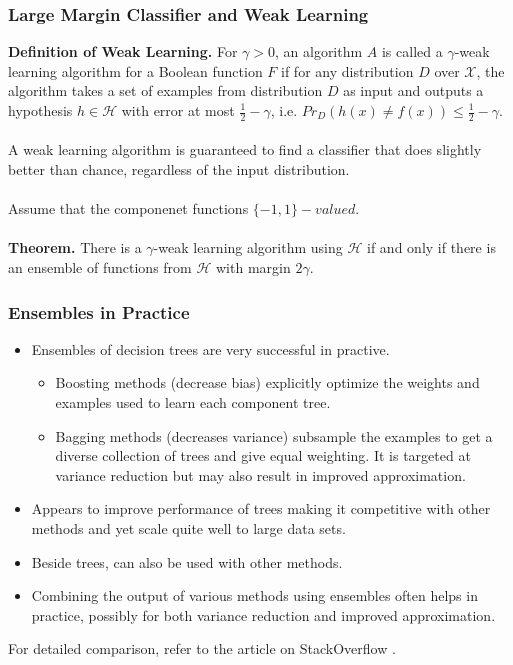 \documentclass{article}
\begin{document}
   \subsubsection{Large Margin Classifier and Weak Learning}
   \textbf{Definition of Weak Learning.} For $\gamma > 0$, an algorithm $A$ is called a $\gamma$-weak learning algorithm for a Boolean function $F$ if for any distribution $D$ over $\mathcal{X}$, the algorithm takes a set of examples from distribution $D$ as input and outputs a hypothesis $h \in \mathcal{H}$ with error at most $\frac{1}{2} - \gamma$, i.e. $Pr_D (h(x) \neq f(x)) \leq \frac{1}{2} - \gamma$.
   \\\\
   A weak learning algorithm is guaranteed to find a classifier that does slightly better than chance, regardless of the input distribution.
   \\\\
   Assume that the componenet functions $\{-1,1\}-valued$. 
   \\\\
   \textbf{Theorem.} There is a $\gamma$-weak learning algorithm using $\mathcal{H}$ if and only if there is an ensemble of functions from $\mathcal{H}$ with margin $2\gamma$.
   
   \subsubsection{Ensembles in Practice}
   \begin{itemize}
   \item Ensembles of decision trees are very successful in practive.
   \begin{itemize}
   \item Boosting methods (decrease bias) explicitly optimize the weights and examples used to learn each component tree.
   \item Bagging methods (decreases variance) subsample the examples to get a diverse collection of trees and give equal weighting. It is targeted at variance reduction but may also result in improved approximation.
   \end{itemize}
   \item Appears to improve performance of trees making it competitive with other methods and yet scale quite well to large data sets.
   \item Beside trees, can also be used with other methods.
   \item Combining the output of various methods using ensembles often helps in practice, possibly for both variance reduction and improved approximation.
   \end{itemize}
   For detailed comparison, refer to the article on StackOverflow \cite{19053}.
   
\end{document}
